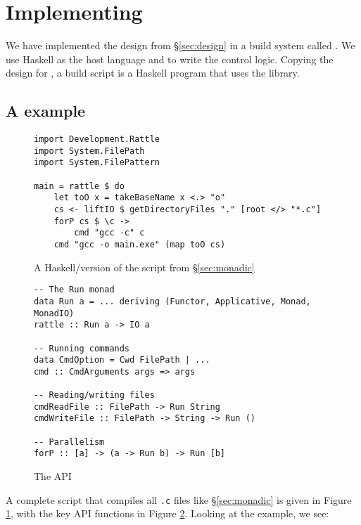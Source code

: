 \section{Implementing \Rattle}
\label{sec:implementation}

We have implemented the design from \S\ref{sec:design} in a build system called \Rattle. We use Haskell as the host language and to write the control logic. Copying the design for \Shake \cite{shake}, a \Rattle build script is a Haskell program that uses the \Rattle library.

\subsection{A \Rattle example}

\begin{figure}
\begin{small}
\begin{verbatim}
import Development.Rattle
import System.FilePath
import System.FilePattern

main = rattle $ do
    let toO x = takeBaseName x <.> "o"
    cs <- liftIO $ getDirectoryFiles "." [root </> "*.c"]
    forP cs $ \c ->
        cmd "gcc -c" c
    cmd "gcc -o main.exe" (map toO cs)
\end{verbatim}
\end{small}
\caption{A Haskell/\Rattle version of the script from \S\ref{sec:monadic}}
\label{fig:rattle_example}
\end{figure}

\begin{figure}
\begin{small}
\begin{verbatim}
-- The Run monad
data Run a = ... deriving (Functor, Applicative, Monad, MonadIO)
rattle :: Run a -> IO a

-- Running commands
data CmdOption = Cwd FilePath | ...
cmd :: CmdArguments args => args

-- Reading/writing files
cmdReadFile :: FilePath -> Run String
cmdWriteFile :: FilePath -> String -> Run ()

-- Parallelism
forP :: [a] -> (a -> Run b) -> Run [b]
\end{verbatim}
\end{small}
\caption{The \Rattle API}
\label{fig:api}
\end{figure}

A complete \Rattle script that compiles all \texttt{.c} files like \S\ref{sec:monadic} is given in Figure \ref{fig:rattle_example}, with the key API functions in Figure \ref{fig:api}. Looking at the example, we see:

